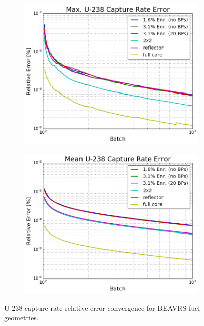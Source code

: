 \begin{figure}[h!]
\centering
\begin{subfigure}{\textwidth}
  \centering
  \includegraphics[width=0.8\linewidth]{figures/benchmarks/capture-rates/capt-conv-max-assms}
  \caption{}
  \label{fig:chap7-capt-rate-max-conv}
\end{subfigure}
\begin{subfigure}{\textwidth}
  \centering
  \includegraphics[width=0.8\linewidth]{figures/benchmarks/capture-rates/capt-conv-mean-assms}
  \caption{}
  \label{fig:chap7-capt-rate-max-conv}
\end{subfigure}
\caption[U-238 capture rate error convergence for BEAVRS geometries]{U-238 capture rate relative error convergence for \ac{BEAVRS} fuel geometries.}
\label{fig:chap7-capt-rates-conv}
\end{figure}